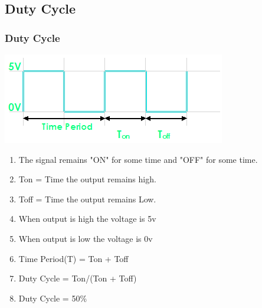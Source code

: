 \documentclass[table,10pt,red]{beamer}	%
\begin{document}
\subsection{Duty Cycle}


\begin{frame}[shrink = 2]

\frametitle{Duty Cycle} \pause

\includegraphics[width = \linewidth]{50_dutycycle} \pause

\begin{enumerate}[$\checkmark$]

\item<+-|alert@+> The signal remains "ON" for some time and  "OFF" for some time.

\item<+-|alert@+> Ton = Time the output remains high.

\item<+-|alert@+> Toff = Time the output remains Low.

\item<+-|alert@+> When output is high the voltage is 5v

\item<+-|alert@+> When output is low the voltage is 0v  

\item<+-|alert@+> Time Period(T) = Ton + Toff

\item<+-|alert@+> Duty Cycle = Ton/(Ton + Toff)

\item<+-|alert@+> Duty Cycle = 50\%

\end{enumerate}

\end{frame}


\end{document}
